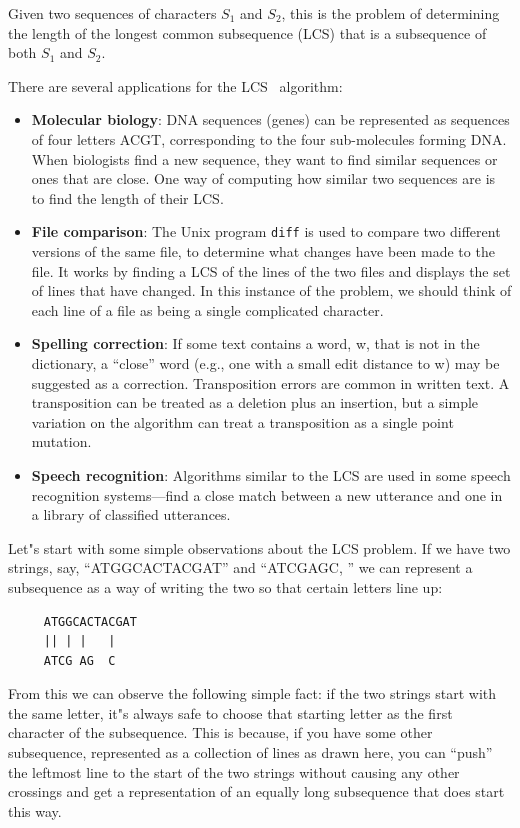\documentclass[justified, sixbynine]{tufte-book}
\def\ft{\small\tt}
\theoremstyle{plain}%
\newtheorem * {corollary}{Corollary}
\theoremstyle{definition}
\theoremstyle{remark}
\newtheorem * {remark}{Remark}
\newtheorem * {note}{Note}
\begin{document}
\begin{fullwidth}
Given two sequences of characters $S_1$ and $S_2$, this is the problem of determining the length of the longest common subsequence (LCS) that is a subsequence of both $S_1$ and $S_2$.

There are several applications for the LCS~\cite{bergroth} algorithm:

\begin{itemize}
\item  {\bf Molecular biology}: DNA sequences (genes) can be represented as sequences of four letters ACGT, corresponding to the four sub-molecules forming DNA. When biologists find a new sequence, they want to find similar sequences or ones that are close. One way of computing how similar two sequences are is to find the length of their LCS.

\item  {\bf File comparison}: The Unix program {\ft diff} is used to compare
two different versions of the same file, to determine what changes have been
made to the file. It works by finding a LCS of the
lines of the two files and displays the set of lines that have changed. In
this instance of the problem, we should think of each line of a file as being
a single complicated character.

\item  {\bf Spelling correction}: If some text contains a word, w, that is not
in the dictionary, a ``close'' word (e.g., one with a small edit distance to w)
may be suggested as a correction. Transposition errors are common in written
text. A transposition can be treated as a deletion plus an insertion, but a
simple variation on the algorithm can treat a transposition as a single
point mutation.

\item  {\bf Speech recognition}: Algorithms similar to the LCS are used in
some speech recognition systems---find a close match between a new utterance
and one in a library of classified utterances.
\end{itemize}

Let"s start with some simple observations about the LCS problem. If we have
two strings, say, ``ATGGCACTACGAT'' and ``ATCGAGC, '' we can represent a
subsequence as a way of writing the two so that certain letters line up:
\begin{lstlisting}
     ATGGCACTACGAT
     || | |   |
     ATCG AG  C
\end{lstlisting}

From this we can observe the following simple fact: if the two strings start
with the same letter, it"s always safe to choose that starting letter as the
first character of the subsequence. This is because, if you have some other
subsequence, represented as a collection of lines as drawn here, you can
``push'' the leftmost line to the start of the two strings without causing
any other crossings and get a representation of an equally long subsequence
that does start this way.


\end{fullwidth}
\end{document}
